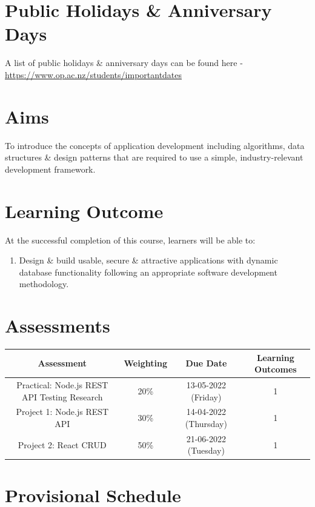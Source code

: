 \documentclass{article}
\begin{document}
\section*{Public Holidays \& Anniversary Days}
A list of public holidays \& anniversary days can be found here - \href{https://www.op.ac.nz/students/importantdates}{https://www.op.ac.nz/students/importantdates}

\section*{Aims}
To introduce the concepts of application development including algorithms, data structures \& design patterns that are required to use a simple, industry-relevant development framework.

\section*{Learning Outcome}
At the successful completion of this course, learners will be able to:
\begin{enumerate}
	\item Design \& build usable, secure \& attractive applications with dynamic database functionality following an appropriate software development methodology.
\end{enumerate}

\section*{Assessments}
\renewcommand{\arraystretch}{1.5}
\begin{tabular}{|c|c|c|c|}
	\hline
	\textbf{Assessment}                                 & \textbf{Weighting} & \textbf{Due Date}            & \textbf{Learning Outcomes} \\ \hline
	\small Practical: Node.js REST API Testing Research & \small 20\%        & \small 13-05-2022 (Friday)   & \small 1                   \\ \hline
	\small Project 1: Node.js REST API                  & \small 30\%        & \small 14-04-2022 (Thursday) & \small 1                   \\ \hline
	\small Project 2: React CRUD                        & \small 50\%        & \small 21-06-2022 (Tuesday)  & \small 1                   \\ \hline
\end{tabular}


\section*{Provisional Schedule}
\end{document}

